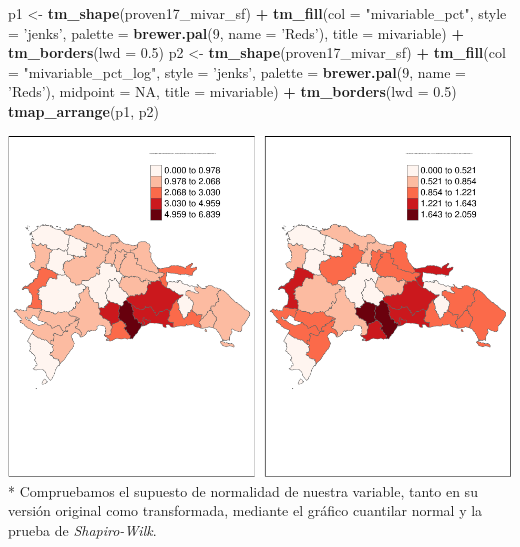 \documentclass[11pt,]{article}
\newenvironment{Shaded}{\begin{snugshade}}{\end{snugshade}}
\newcommand{\KeywordTok}[1]{\textcolor[rgb]{0.13,0.29,0.53}{\textbf{#1}}}
\newcommand{\DataTypeTok}[1]{\textcolor[rgb]{0.13,0.29,0.53}{#1}}
\newcommand{\DecValTok}[1]{\textcolor[rgb]{0.00,0.00,0.81}{#1}}
\newcommand{\FloatTok}[1]{\textcolor[rgb]{0.00,0.00,0.81}{#1}}
\newcommand{\StringTok}[1]{\textcolor[rgb]{0.31,0.60,0.02}{#1}}
\newcommand{\OtherTok}[1]{\textcolor[rgb]{0.56,0.35,0.01}{#1}}
\newcommand{\OperatorTok}[1]{\textcolor[rgb]{0.81,0.36,0.00}{\textbf{#1}}}
\newcommand{\NormalTok}[1]{#1}
\begin{document}
\begin{Shaded}
\begin{Highlighting}[]
\NormalTok{p1 <-}\StringTok{ }\KeywordTok{tm_shape}\NormalTok{(proven17_mivar_sf) }\OperatorTok{+}
\StringTok{  }\KeywordTok{tm_fill}\NormalTok{(}\DataTypeTok{col =} \StringTok{"mivariable_pct"}\NormalTok{, }\DataTypeTok{style =} \StringTok{'jenks'}\NormalTok{,}
          \DataTypeTok{palette =} \KeywordTok{brewer.pal}\NormalTok{(}\DecValTok{9}\NormalTok{, }\DataTypeTok{name =} \StringTok{'Reds'}\NormalTok{), }\DataTypeTok{title =}\NormalTok{ mivariable) }\OperatorTok{+}
\StringTok{  }\KeywordTok{tm_borders}\NormalTok{(}\DataTypeTok{lwd =} \FloatTok{0.5}\NormalTok{)}
\NormalTok{p2 <-}\StringTok{ }\KeywordTok{tm_shape}\NormalTok{(proven17_mivar_sf) }\OperatorTok{+}
\StringTok{  }\KeywordTok{tm_fill}\NormalTok{(}\DataTypeTok{col =} \StringTok{"mivariable_pct_log"}\NormalTok{, }\DataTypeTok{style =} \StringTok{'jenks'}\NormalTok{,}
          \DataTypeTok{palette =} \KeywordTok{brewer.pal}\NormalTok{(}\DecValTok{9}\NormalTok{, }\DataTypeTok{name =} \StringTok{'Reds'}\NormalTok{), }\DataTypeTok{midpoint =} \OtherTok{NA}\NormalTok{, }\DataTypeTok{title =}\NormalTok{ mivariable) }\OperatorTok{+}
\StringTok{  }\KeywordTok{tm_borders}\NormalTok{(}\DataTypeTok{lwd =} \FloatTok{0.5}\NormalTok{) }
\KeywordTok{tmap_arrange}\NormalTok{(p1, p2)}
\end{Highlighting}
\end{Shaded}

\includegraphics{proyecto_files/figure-latex/pctfueramaps-1.pdf} *
Compruebamos el supuesto de normalidad de nuestra variable, tanto en su
versión original como transformada, mediante el gráfico cuantilar normal
y la prueba de \emph{Shapiro-Wilk}.
\end{document}
